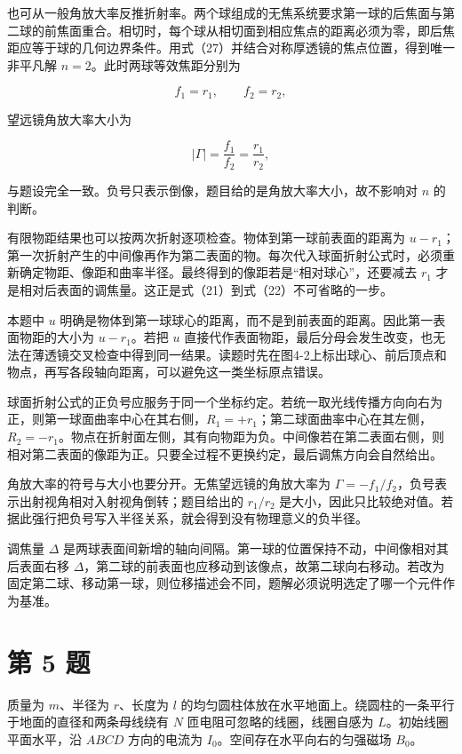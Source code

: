\documentclass[12pt,a4paper,UTF8]{ctexart}
\begin{document}
也可从一般角放大率反推折射率。两个球组成的无焦系统要求第一球的后焦面与第二球的前焦面重合。相切时，每个球从相切面到相应焦点的距离必须为零，即后焦距应等于球的几何边界条件。用式（27）并结合对称厚透镜的焦点位置，得到唯一非平凡解
\(n=2\)。此时两球等效焦距分别为

\[
f_1=r_1,
\qquad
f_2=r_2, \tag{28}
\]

望远镜角放大率大小为

\[
|\Gamma|=\frac{f_1}{f_2}=\frac{r_1}{r_2}, \tag{29}
\]

与题设完全一致。负号只表示倒像，题目给的是角放大率大小，故不影响对 \(n\)
的判断。

有限物距结果也可以按两次折射逐项检查。物体到第一球前表面的距离为
\(u-r_1\)；第一次折射产生的中间像再作为第二表面的物。每次代入球面折射公式时，必须重新确定物距、像距和曲率半径。最终得到的像距若是``相对球心''，还要减去
\(r_1\) 才是相对后表面的调焦量。这正是式（21）到式（22）不可省略的一步。

本题中 \(u\)
明确是物体到第一球球心的距离，而不是到前表面的距离。因此第一表面物距的大小为
\(u-r_1\)。若把 \(u\)
直接代作表面物距，最后分母会发生改变，也无法在薄透镜交叉检查中得到同一结果。读题时先在图4-2上标出球心、前后顶点和物点，再写各段轴向距离，可以避免这一类坐标原点错误。

球面折射公式的正负号应服务于同一个坐标约定。若统一取光线传播方向向右为正，则第一球面曲率中心在其右侧，\(R_1=+r_1\)；第二球面曲率中心在其左侧，\(R_2=-r_1\)。物点在折射面左侧，其有向物距为负。中间像若在第二表面右侧，则相对第二表面的像距为正。只要全过程不更换约定，最后调焦方向会自然给出。

角放大率的符号与大小也要分开。无焦望远镜的角放大率为
\(\Gamma=-f_1/f_2\)，负号表示出射视角相对入射视角倒转；题目给出的
\(r_1/r_2\)
是大小，因此只比较绝对值。若据此强行把负号写入半径关系，就会得到没有物理意义的负半径。

调焦量 \(\Delta\)
是两球表面间新增的轴向间隔。第一球的位置保持不动，中间像相对其后表面右移
\(\Delta\)，第二球的前表面也应移动到该像点，故第二球向右移动。若改为固定第二球、移动第一球，则位移描述会不同，题解必须说明选定了哪一个元件作为基准。

\newpage

\section{第 5 题}\label{ux7b2c-5-ux9898}

质量为 \(m\)、半径为 \(r\)、长度为 \(l\)
的均匀圆柱体放在水平地面上。绕圆柱的一条平行于地面的直径和两条母线绕有
\(N\) 匝电阻可忽略的线圈，线圈自感为 \(L\)。初始线圈平面水平，沿
\(ABCD\) 方向的电流为 \(I_0\)。空间存在水平向右的匀强磁场 \(B_0\)。
\end{document}
